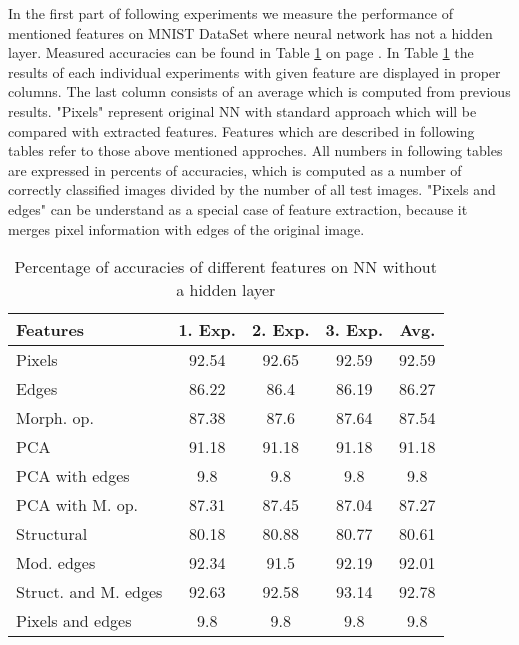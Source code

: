 \documentclass[journal]{IEEEtran}
\begin{document}
In the first part of following experiments we measure the performance of mentioned features on MNIST DataSet where neural network has not a hidden layer. Measured accuracies can be found in Table \ref{tab:extab1} on page \pageref{tab:extab1}. In Table \ref{tab:extab1} the results of each individual experiments with given feature are displayed in proper columns. The last column consists of an average which is computed from previous results. "Pixels" represent original NN with standard approach which will be compared with extracted features. Features which are described in following tables refer to those above mentioned approches. All numbers in following tables are expressed in percents of accuracies, which is computed as a number of correctly classified images divided by the number of all test images. "Pixels and edges" can be understand as a special case of feature extraction, because it merges pixel information with edges of the original image.
\begin{table}
  \centering
  \caption{Percentage of accuracies of different features on NN without a hidden layer}
  \begin{tabular}{|l||c|c|c|c|}
  \hline
    Features & 1. Exp. & 2. Exp. & 3. Exp. & Avg. \\
  \hline
  \hline
  Pixels & 92.54 & 92.65 & 92.59 & 92.59 \\
  \hline
  Edges & 86.22 & 86.4 &  86.19 & 86.27\\ 
  \hline
 Morph. op. & 87.38 & 87.6 & 87.64 & 87.54\\
 \hline
 PCA & 91.18 & 91.18 & 91.18 & 91.18\\
 \hline
 PCA with edges & 9.8 &   9.8 &  9.8 & 9.8 \\
 \hline
 PCA with M. op. &  87.31 & 87.45 & 87.04 & 87.27\\
 \hline
 Structural &  80.18 &  80.88 & 80.77 & 80.61\\
 \hline
 Mod. edges & 92.34 &  91.5 &  92.19 & 92.01\\
 \hline
 Struct. and M. edges & 92.63 & 92.58 &  93.14 &  92.78\\
 \hline
 Pixels and edges & 9.8 & 9.8 &  9.8 & 9.8\\
 \hline
  \end{tabular}
  \label{tab:extab1}
\end{table}
\end{document}
